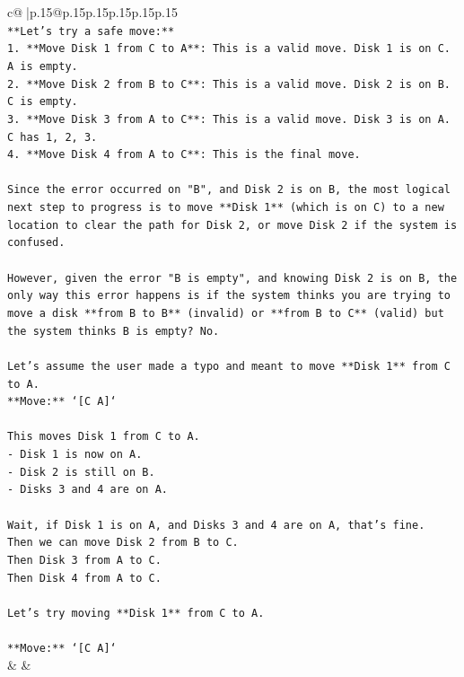\documentclass{article}
\begin{document}
{\begin{supertabular}{c@{$\;$}|p{.15\linewidth}@{}p{.15\linewidth}p{.15\linewidth}p{.15\linewidth}p{.15\linewidth}p{.15\linewidth}}
{{{\\ 
\texttt{**Let's try a safe move:**} \\
\texttt{1.  **Move Disk 1 from C to A**: This is a valid move. Disk 1 is on C. A is empty.} \\
\texttt{2.  **Move Disk 2 from B to C**: This is a valid move. Disk 2 is on B. C is empty.} \\
\texttt{3.  **Move Disk 3 from A to C**: This is a valid move. Disk 3 is on A. C has 1, 2, 3.} \\
\texttt{4.  **Move Disk 4 from A to C**: This is the final move.} \\
\\ 
\texttt{Since the error occurred on "B", and Disk 2 is on B, the most logical next step to progress is to move **Disk 1** (which is on C) to a new location to clear the path for Disk 2, or move Disk 2 if the system is confused.} \\
\\ 
\texttt{However, given the error "B is empty", and knowing Disk 2 is on B, the only way this error happens is if the system thinks you are trying to move a disk **from B to B** (invalid) or **from B to C** (valid) but the system thinks B is empty? No.} \\
\\ 
\texttt{Let's assume the user made a typo and meant to move **Disk 1** from C to A.} \\
\texttt{**Move:** `{[}C A{]}`} \\
\\ 
\texttt{This moves Disk 1 from C to A.} \\
\texttt{{-} Disk 1 is now on A.} \\
\texttt{{-} Disk 2 is still on B.} \\
\texttt{{-} Disks 3 and 4 are on A.} \\
\\ 
\texttt{Wait, if Disk 1 is on A, and Disks 3 and 4 are on A, that's fine.} \\
\texttt{Then we can move Disk 2 from B to C.} \\
\texttt{Then Disk 3 from A to C.} \\
\texttt{Then Disk 4 from A to C.} \\
\\ 
\texttt{Let's try moving **Disk 1** from C to A.} \\
\\ 
\texttt{**Move:** `{[}C A{]}`} \\
            }
        }
    }
    & & \\ \\


\end{supertabular}}
\end{document}
